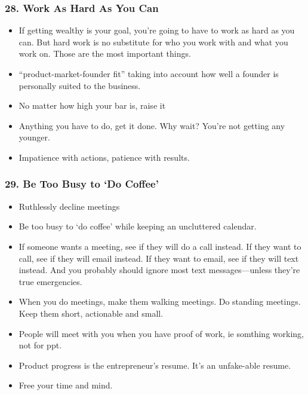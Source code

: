 \begin{frame}[fragile]
\frametitle{28. Work As Hard As You Can}
\begin{itemize}
\item If getting wealthy is your goal, you're going to have to work as hard as you can. But hard work is no
substitute for who you work with and what you work on. Those are the most important things.
\item  ``product-market-founder  fit'' taking into account how well a founder is personally suited to the business.
\item No matter how high your bar is, raise it
\item Anything you have to do, get it done. Why wait? You're not getting any younger.
\item Impatience with actions, patience with results.
\end{itemize}
\end{frame}

\begin{frame}[fragile]
\frametitle{29. Be Too Busy to ‘Do Coffee'}
\begin{itemize}
\item Ruthlessly decline meetings
\item Be too busy to `do coffee' while keeping an uncluttered calendar.
\item If someone wants a meeting, see if they will do a call instead. If they want to call, see if they will email
instead. If they want to email, see if they will text instead. And you probably should ignore most text
messages—unless they're true emergencies.
\item When you do meetings, make them walking
meetings. Do standing meetings. Keep them short, actionable and small. 
\item People will meet with you when you have proof of work, ie somthing working, not for ppt.
\item  Product progress is the entrepreneur's resume. It's an unfake-able resume.
\item Free your time and mind.
\end{itemize}
\end{frame}


